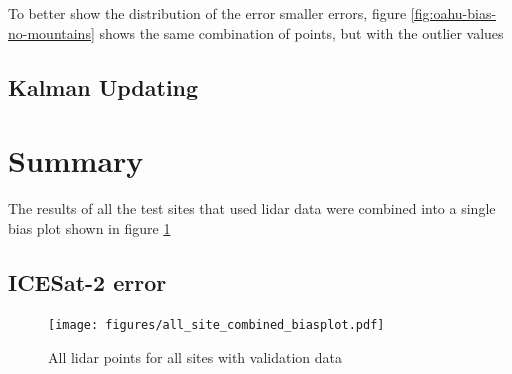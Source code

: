 To better show the distribution of the error smaller errors, figure \ref{fig:oahu-bias-no-mountains} shows the same combination of points, but with the outlier values 

\subsection{Kalman Updating}



\section{Summary}
The results of all the test sites that used lidar data were combined into a single bias plot shown in figure \ref{fig:all-sites-biasplot}

\subsection{ICESat-2 error}

\begin{figure}[h]
    \centering
    \texttt{[image: figures/all\_site\_combined\_biasplot.pdf]}
    \caption{All lidar points for all sites with validation data}
    \label{fig:all-sites-biasplot}
\end{figure}

